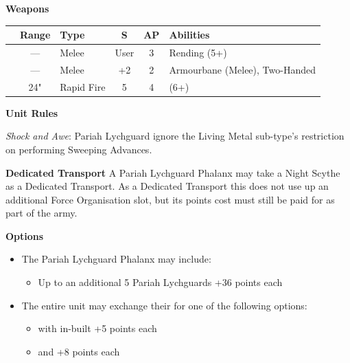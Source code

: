 \begin{minipage}[t]{0.72\textwidth}
	\vspace*{2em}
	\textbf{Weapons}
	
	\begin{tabular}{L{90 pt} c C{40pt} *{2}{c} >{\raggedright\arraybackslash}p{130pt}}
		& Range & Type & S & AP & Abilities \\
		\hline
		 & — & Melee & User & 3 & Rending (5+) \\
		 & — & Melee & +2 & 2 & Armourbane (Melee), Two-Handed \\
		 & 24" & Rapid Fire & 5 & 4 &  (6+) \\
	\end{tabular}
	
	\vspace*{2em}
	\textbf{Unit Rules}
	
	\textit{Shock and Awe}: Pariah Lychguard ignore the Living Metal sub-type's restriction on performing Sweeping Advances.
		
	\vspace*{2em}
	\textbf{Dedicated Transport}
	A Pariah Lychguard Phalanx may take a Night Scythe as a Dedicated Transport. As a Dedicated Transport this does not use up an additional Force Organisation slot, but its points cost must still be paid for as part of the army.
	
	\vspace*{2em}
	\textbf{Options}
	\begin{itemize}
		\item The Pariah Lychguard Phalanx may include:
		\begin{itemize}
			\item Up to an additional 5 Pariah Lychguards \dotfill +36 points each
		\end{itemize}
		\item The entire unit may exchange their  for one of the following options:
		\begin{itemize}
			\item {} with in-built  \dotfill +5 points each
			\item {} and  \dotfill +8 points each
		\end{itemize}
	\end{itemize}
\end{minipage}


\newpage
